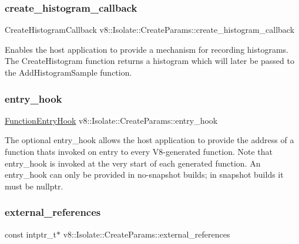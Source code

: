 \subsubsection{\texorpdfstring{create\+\_\+histogram\+\_\+callback}{create\_histogram\_callback}}
{\footnotesize\ttfamily Create\+Histogram\+Callback v8\+::\+Isolate\+::\+Create\+Params\+::create\+\_\+histogram\+\_\+callback}

Enables the host application to provide a mechanism for recording histograms. The Create\+Histogram function returns a histogram which will later be passed to the Add\+Histogram\+Sample function. \mbox{\label{structv8_1_1Isolate_1_1CreateParams_aa7aa18bbe2d86713e5b074a93b38dc60}} 
\subsubsection{\texorpdfstring{entry\+\_\+hook}{entry\_hook}}
{\footnotesize\ttfamily \mbox{\hyperlink{namespacev8_aaf07fb6bb13f295da3c6568938b7dec5}{Function\+Entry\+Hook}} v8\+::\+Isolate\+::\+Create\+Params\+::entry\+\_\+hook}

The optional entry\+\_\+hook allows the host application to provide the address of a function that\textquotesingle{}s invoked on entry to every V8-\/generated function. Note that entry\+\_\+hook is invoked at the very start of each generated function. An entry\+\_\+hook can only be provided in no-\/snapshot builds; in snapshot builds it must be nullptr. \mbox{\label{structv8_1_1Isolate_1_1CreateParams_a89b8c9dc74efbdcd93ab5786eae6fe19}} 
\subsubsection{\texorpdfstring{external\+\_\+references}{external\_references}}
{\footnotesize\ttfamily const intptr\+\_\+t$\ast$ v8\+::\+Isolate\+::\+Create\+Params\+::external\+\_\+references}

